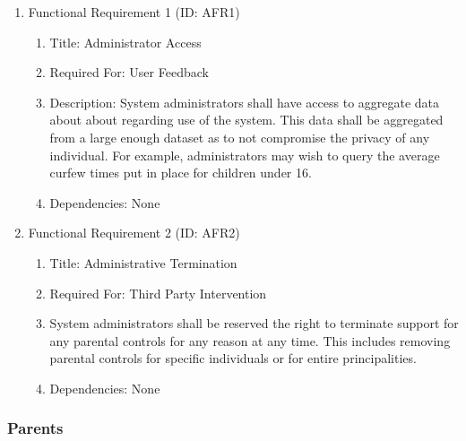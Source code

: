 \documentclass[12pt]{article}
\begin{document}
\begin{enumerate}
    \item Functional Requirement 1 (ID: AFR1)
    \begin{enumerate}
        \item Title: Administrator Access
        \item Required For: User Feedback
        \item Description: System administrators shall have access to aggregate data about about regarding use of
        the system. This data shall be aggregated from a large enough dataset as to not compromise the privacy of
        any individual. For example, administrators may wish to query the average curfew times put in place for
        children under 16.
        \item Dependencies: None
    \end{enumerate}
    \item Functional Requirement 2 (ID: AFR2)
    \begin{enumerate}
        \item Title: Administrative Termination
        \item Required For: Third Party Intervention
        \item System administrators shall be reserved the right to terminate support for any parental controls for
        any reason at any time. This includes removing parental controls for specific individuals or for entire
        principalities.
        \item Dependencies: None
    \end{enumerate}
\end{enumerate}

\subsubsection{Parents}
\end{document}
